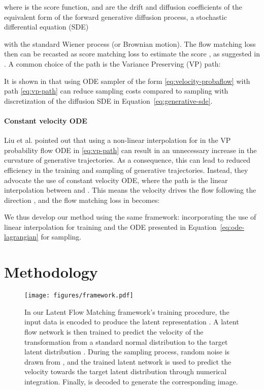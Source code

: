 \documentclass{article}
\theoremstyle{plain}
\theoremstyle{definition}
\theoremstyle{remark}
\begin{document}
where  is the score function,  and  are the drift and diffusion coefficients of the equivalent form of the forward generative diffusion process, a stochastic differential equation (SDE)

with  the standard Wiener process (or Brownian motion).
The flow matching loss then can be recasted as score matching loss \cite{hyvarinen2005estimation} to estimate the score , as suggested in \cite{lee2023minimizing,zheng2023improved}.
A common choice of the path  is the Variance Preserving (VP) path:

It is shown in \cite{karras2022elucidating} that using ODE sampler of the form \eqref{eq:velocity-probaflow} with path \eqref{eq:vp-path} can reduce sampling costs compared to sampling with discretization of the diffusion SDE in Equation~\eqref{eq:generative-sde}.


\paragraph{Constant velocity ODE}
Liu et al. \cite{liu2023flow} pointed out that using a non-linear interpolation for  in the VP probability flow ODE in \eqref{eq:vp-path} can result in an unnecessary increase in the curvature of generative trajectories.
As a consequence, this can lead to reduced efficiency in the training and sampling of generative trajectories.
Instead, they advocate the use of constant velocity ODE, where the path  is the linear interpolation between  and .
This means the velocity drives the flow following the direction , and the flow matching loss in  becomes:

We thus develop our method using the same framework: incorporating the use of linear interpolation for training and the ODE presented in Equation~\eqref{eq:ode-lagrangian} for sampling.


\section{Methodology}

\begin{figure}[!ht]
    \centering
    \texttt{[image: figures/framework.pdf]}
\caption{In our Latent Flow Matching framework's training procedure, the input data  is encoded to produce the latent representation . A latent flow network is then trained to predict the velocity of the transformation from a standard normal distribution  to the target latent distribution . During the sampling process, random noise  is drawn from , and the trained latent network is used to predict the velocity towards the target latent distribution  through numerical integration. Finally,  is decoded to generate the corresponding image.}
    \label{fig:framework}
\end{figure}
\end{document}

